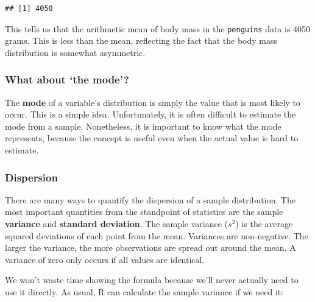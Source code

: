 \documentclass[
]{book}
\newenvironment{Shaded}{\begin{snugshade}}{\end{snugshade}}
\newcommand{\AttributeTok}[1]{\textcolor[rgb]{0.77,0.63,0.00}{#1}}
\newcommand{\ConstantTok}[1]{\textcolor[rgb]{0.00,0.00,0.00}{#1}}
\newcommand{\FunctionTok}[1]{\textcolor[rgb]{0.00,0.00,0.00}{#1}}
\newcommand{\NormalTok}[1]{#1}
\newcommand{\SpecialCharTok}[1]{\textcolor[rgb]{0.00,0.00,0.00}{#1}}
\newenvironment{greybox}{
  \definecolor{shadecolor}{rgb}{0.95,0.95,0.95}  %
  \color{black}
  \begin{shaded}}
 {\end{shaded}}
\newenvironment{infobox}[1]
  {
  \begin{itemize}
  \renewcommand{\labelitemi}{
    \raisebox{-.7\height}[0pt][0pt]{
      {\setkeys{Gin}{width=3em,keepaspectratio}
        \texttt{[image: images/\#1]}}
    }
  }
  \setlength{\fboxsep}{1em}
  \begin{greybox}
  \item
  }
  {
  \end{greybox}
  \end{itemize}
  }
\begin{document}
\begin{Shaded}
\end{Shaded}

\begin{verbatim}
## [1] 4050
\end{verbatim}

This tells us that the arithmetic mean of body mass in the \texttt{penguins} data is 4050 grams. This is less than the mean, reflecting the fact that the body mass distribution is somewhat asymmetric.

\begin{infobox}{information}

\hypertarget{what-about-the-mode}{%
\subsubsection*{What about `the mode'?}\label{what-about-the-mode}}

The \textbf{mode} of a variable's distribution is simply the value that is most likely to occur. This is a simple idea. Unfortunately, it is often difficult to estimate the mode from a sample. Nonetheless, it is important to know what the mode represents, because the concept is useful even when the actual value is hard to estimate.

\end{infobox}

\hypertarget{dispersion}{%
\subsubsection{Dispersion}\label{dispersion}}

There are many ways to quantify the dispersion of a sample distribution. The most important quantities from the standpoint of statistics are the sample \textbf{variance} and \textbf{standard deviation}. The sample variance (\(s^2\)) is the average squared deviations of each point from the mean. Variances are non-negative. The larger the variance, the more observations are spread out around the mean. A variance of zero only occurs if all values are identical.

We won't waste time showing the formula because we'll never actually need to use it directly. As usual, R can calculate the sample variance if we need it:
\end{document}
